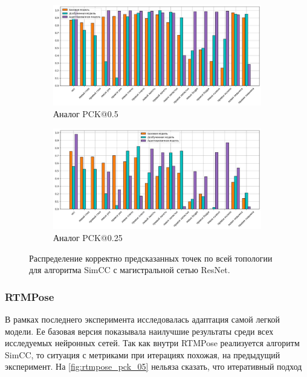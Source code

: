 \begin{figure}[H]
\centering
\begin{subfigure}{.8\textwidth}
	\centering
	\includegraphics[width=\textwidth]{./images/results/simcc/simcc_05_s}
	\caption{Аналог PCK@0.5}
	\label{fig:simcc_distr_05}
\end{subfigure}
\begin{subfigure}{.8\textwidth}
	\centering
	\includegraphics[width=\textwidth]{./images/results/simcc/simcc_025_s}
	\caption{Аналог PCK@0.25}
	\label{fig:simcc_distr_025}
\end{subfigure}
\caption{Распределение корректно предсказанных точек по всей топологии для алгоритма SimCC с магистральной сетью ResNet.}
\label{fig:simcc_distr}
\end{figure}

\subsubsection*{RTMPose}

В рамках последнего эксперимента исследовалась адаптация самой легкой модели. Ее базовая версия показывала наилучшие результаты среди всех исследуемых нейронных сетей. Так как внутри RTMPose реализуется алгоритм SimCC, то ситуация с метриками при итерациях похожая, на предыдущий эксперимент. На \autoref{fig:rtmpose_pck_05} нельяза сказать, что итеративный подход 

